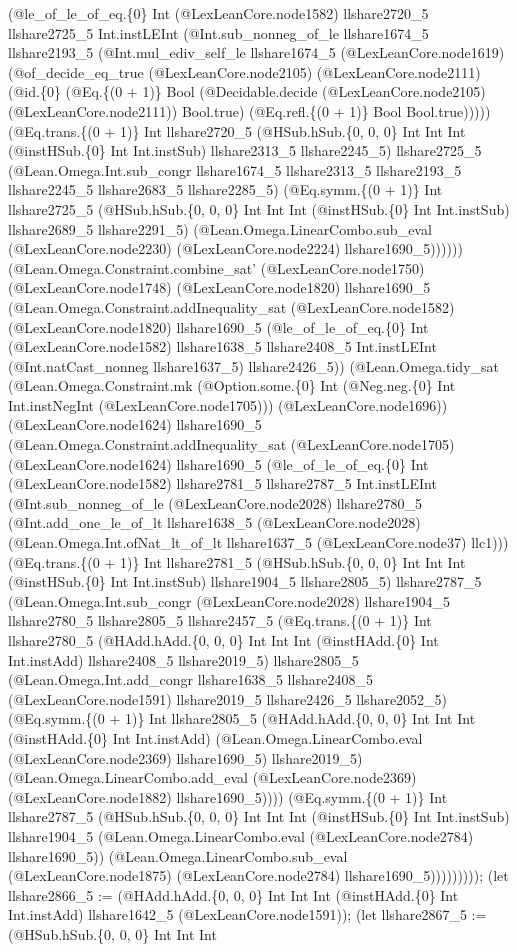 \documentclass[11pt]{article}
\begin{document}
(@le\_of\_le\_of\_eq.\{0\} Int (@LexLeanCore.node1582) llshare2720\_5 llshare2725\_5 Int.instLEInt (@Int.sub\_nonneg\_of\_le llshare1674\_5 llshare2193\_5 (@Int.mul\_ediv\_self\_le llshare1674\_5 (@LexLeanCore.node1619) (@of\_decide\_eq\_true (@LexLeanCore.node2105) (@LexLeanCore.node2111) (@id.\{0\} (@Eq.\{(0 + 1)\} Bool (@Decidable.decide (@LexLeanCore.node2105) (@LexLeanCore.node2111)) Bool.true) (@Eq.refl.\{(0 + 1)\} Bool Bool.true))))) (@Eq.trans.\{(0 + 1)\} Int llshare2720\_5 (@HSub.hSub.\{0, 0, 0\} Int Int Int (@instHSub.\{0\} Int Int.instSub) llshare2313\_5 llshare2245\_5) llshare2725\_5 (@Lean.Omega.Int.sub\_congr llshare1674\_5 llshare2313\_5 llshare2193\_5 llshare2245\_5 llshare2683\_5 llshare2285\_5) (@Eq.symm.\{(0 + 1)\} Int llshare2725\_5 (@HSub.hSub.\{0, 0, 0\} Int Int Int (@instHSub.\{0\} Int Int.instSub) llshare2689\_5 llshare2291\_5) (@Lean.Omega.LinearCombo.sub\_eval (@LexLeanCore.node2230) (@LexLeanCore.node2224) llshare1690\_5)))))) (@Lean.Omega.Constraint.combine\_sat' (@LexLeanCore.node1750) (@LexLeanCore.node1748) (@LexLeanCore.node1820) llshare1690\_5 (@Lean.Omega.Constraint.addInequality\_sat (@LexLeanCore.node1582) (@LexLeanCore.node1820) llshare1690\_5 (@le\_of\_le\_of\_eq.\{0\} Int (@LexLeanCore.node1582) llshare1638\_5 llshare2408\_5 Int.instLEInt (@Int.natCast\_nonneg llshare1637\_5) llshare2426\_5)) (@Lean.Omega.tidy\_sat (@Lean.Omega.Constraint.mk (@Option.some.\{0\} Int (@Neg.neg.\{0\} Int Int.instNegInt (@LexLeanCore.node1705))) (@LexLeanCore.node1696)) (@LexLeanCore.node1624) llshare1690\_5 (@Lean.Omega.Constraint.addInequality\_sat (@LexLeanCore.node1705) (@LexLeanCore.node1624) llshare1690\_5 (@le\_of\_le\_of\_eq.\{0\} Int (@LexLeanCore.node1582) llshare2781\_5 llshare2787\_5 Int.instLEInt (@Int.sub\_nonneg\_of\_le (@LexLeanCore.node2028) llshare2780\_5 (@Int.add\_one\_le\_of\_lt llshare1638\_5 (@LexLeanCore.node2028) (@Lean.Omega.Int.ofNat\_lt\_of\_lt llshare1637\_5 (@LexLeanCore.node37) llc1))) (@Eq.trans.\{(0 + 1)\} Int llshare2781\_5 (@HSub.hSub.\{0, 0, 0\} Int Int Int (@instHSub.\{0\} Int Int.instSub) llshare1904\_5 llshare2805\_5) llshare2787\_5 (@Lean.Omega.Int.sub\_congr (@LexLeanCore.node2028) llshare1904\_5 llshare2780\_5 llshare2805\_5 llshare2457\_5 (@Eq.trans.\{(0 + 1)\} Int llshare2780\_5 (@HAdd.hAdd.\{0, 0, 0\} Int Int Int (@instHAdd.\{0\} Int Int.instAdd) llshare2408\_5 llshare2019\_5) llshare2805\_5 (@Lean.Omega.Int.add\_congr llshare1638\_5 llshare2408\_5 (@LexLeanCore.node1591) llshare2019\_5 llshare2426\_5 llshare2052\_5) (@Eq.symm.\{(0 + 1)\} Int llshare2805\_5 (@HAdd.hAdd.\{0, 0, 0\} Int Int Int (@instHAdd.\{0\} Int Int.instAdd) (@Lean.Omega.LinearCombo.eval (@LexLeanCore.node2369) llshare1690\_5) llshare2019\_5) (@Lean.Omega.LinearCombo.add\_eval (@LexLeanCore.node2369) (@LexLeanCore.node1882) llshare1690\_5)))) (@Eq.symm.\{(0 + 1)\} Int llshare2787\_5 (@HSub.hSub.\{0, 0, 0\} Int Int Int (@instHSub.\{0\} Int Int.instSub) llshare1904\_5 (@Lean.Omega.LinearCombo.eval (@LexLeanCore.node2784) llshare1690\_5)) (@Lean.Omega.LinearCombo.sub\_eval (@LexLeanCore.node1875) (@LexLeanCore.node2784) llshare1690\_5))))))))); (let llshare2866\_5 := (@HAdd.hAdd.\{0, 0, 0\} Int Int Int (@instHAdd.\{0\} Int Int.instAdd) llshare1642\_5 (@LexLeanCore.node1591)); (let llshare2867\_5 := (@HSub.hSub.\{0, 0, 0\} Int Int Int 
\end{document}
